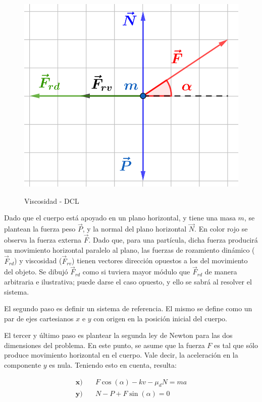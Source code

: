 \documentclass{article}
\begin{document}
\begin{figure}[ht]
\centering
\caption{Viscosidad - DCL}
\includegraphics[scale=1.0]{../../common/img/62.01/theory/07-dynamics-viscosity-fbd.png}
\label{fig:fbd}
\end{figure}

Dado que el cuerpo está apoyado en un plano horizontal, y tiene una masa $m$, se plantean la fuerza peso $\vec{P}$, y la normal del plano horizontal $\vec{N}$. En color rojo se observa la fuerza externa $\vec{F}$. Dado que, para una partícula, dicha fuerza producirá un movimiento horizontal paralelo al plano, las fuerzas de rozamiento dinámico ($\vec{F}_{rd}$) y viscosidad ($\vec{F}_{rv}$) tienen vectores dirección opuestos a los del movimiento del objeto. Se dibujó $\vec{F}_{rd}$ como si tuviera mayor módulo que $\vec{F}_{rd}$ de manera arbitraria e ilustrativa; puede darse el caso opuesto, y ello se sabrá al resolver el sistema.

El segundo paso es definir un sistema de referencia. El mismo se define como un par de ejes cartesianos $x$ e $y$ con origen en la posición inicial del cuerpo.

El tercer y último paso es plantear la segunda ley de Newton para las dos dimensiones del problema. En este punto, se asume que la fuerza $F$ es tal que sólo produce movimiento horizontal en el cuerpo. Vale decir, la aceleración en la componente $y$ es nula. Teniendo esto en cuenta, resulta:

\begin{subequations}
\begin{align}
\textbf{x)} & \quad F \cos(\alpha) - k v - \mu_d N = m a \\
\textbf{y)} & \quad N - P + F \sin(\alpha) = 0
\end{align}
\end{subequations}
\end{document}

